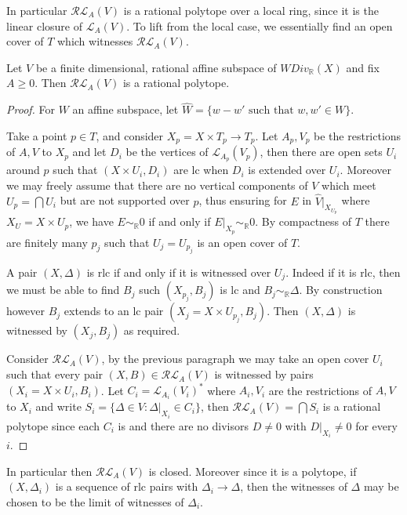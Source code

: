 \documentclass[a4paper,12pt]{amsart}
\begin{document}
	
	In particular $\mathcal{RL}_{A}(V)$ is a rational polytope over a local ring, since it is the linear closure of $\mathcal{L}_{A}(V)$. To lift from the local case, we essentially find an open cover of $T$ which witnesses $\mathcal{RL}_{A}(V)$.
	
	\begin{theorem}\label{rlt-poly}
		Let $V$ be a finite dimensional, rational affine subspace of $WDiv_{\mathbb{R}}(X)$ and fix $A \geq 0$. Then $\mathcal{RL}_{A}(V)$ is a rational polytope.
	\end{theorem}
	
	\begin{proof}
		For $W$ an affine subspace, let $\hat{W}=\{w-w' \text{ such that } w,w' \in W\}$.
		
		Take a point $p \in T$, and consider $X_{p}=X\times T_{p} \to T_{p}$. Let $A_{p},V_{p}$ be the restrictions of $A,V$ to $X_{p}$ and let $D_{i}$ be the vertices of $\mathcal{L}_{A_{p}}(V_{p})$, then there are open sets $U_{i}$ around $p$ such that $(X\times U_{i},D_{i})$ are lc when $D_{i}$ is extended over $U_{i}$. Moreover we may freely assume that there are no vertical components of $V$ which meet $U_{p}= \bigcap U_{i}$ but are not supported over $p$, thus ensuring for $E$ in $\hat{V}|_{X_{U_{p}}}$ where $X_{U}=X\times U_{p}$, we have $E \sim_{\mathbb{R}} 0$ if and only if $E|_{X_{p}}\sim_{\mathbb{R}} 0$. By compactness of $T$ there are finitely many $p_{j}$ such that $U_{j}=U_{p_{j}}$ is an open cover of $T$. 
		
		A pair $(X,\Delta)$ is rlc if and only if it is witnessed over $U_{j}$. Indeed if it is rlc, then we must be able to find $B_{j}$ such $(X_{p_{j}},B_{j})$ is lc and $B_{j} \sim_{\mathbb{R}} \Delta$. By construction however $B_{j}$ extends to an lc pair $(X_{j}=X\times U_{p_{j}},B_{j})$. Then $(X,\Delta)$ is witnessed by $(X_{j}, B_{j})$ as required.
		
		Consider $\mathcal{RL}_{A}(V)$, by the previous paragraph we may take an open cover $U_{i}$ such that every pair $(X,B) \in \mathcal{RL}_{A}(V)$ is witnessed by pairs $(X_{i}=X\times U_{i},B_{i})$. Let $C_{i} = \mathcal{L}_{A_{i}}(V_{i})^{*}$ where $A_{i}, V_{i}$ are the restrictions of $A,V$ to $X_{i}$ and write $S_{i}=\{\Delta \in V: \Delta|_{X_{i}} \in C_{i}\}$, then $\mathcal{RL}_{A}(V)= \bigcap S_{i}$ is a rational polytope since each $C_{i}$ is and there are no divisors $D \neq 0$ with $D|_{X_{i}} \neq 0$ for every $i$.
	\end{proof}
	
	In particular then $\mathcal{RL}_{A}(V)$ is closed. Moreover since it is a polytope, if $(X,\Delta_{i})$ is a sequence of rlc pairs with $\Delta_{i} \to \Delta$, then the witnesses of $\Delta$ may be chosen to be the limit of witnesses of $\Delta_{i}$. 
	
\end{document}
